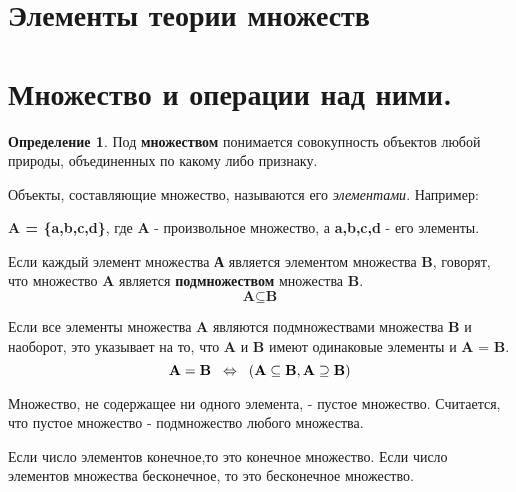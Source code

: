 \documentclass[12pt, a4paper, oneside]{article}
\theoremstyle{plain} %
\theoremstyle{definition}
\newtheorem*{definition}{Определение}  %
\newcommand{\indef}[1]{\textbf{ \color{dark_red} #1}}
\begin{document}
\section*{Элементы теории множеств}


\section{Множество и операции над ними.}

\begin{definition}
Под \indef{множеством} понимается совокупность объектов любой природы, объединенных по какому либо признаку.\par
Объекты, составляющие множество, называются его \textit{элементами}.
Например: \par
\hspace{2mm} \textbf{A = \{a,b,c,d\}}, где \textbf{A} - произвольное множество, а \textbf{a,b,c,d} - его элементы.\par
Если каждый элемент множества \textbf{А} является элементом множества \textbf{B}, говорят, что множество \textbf{A} является \indef{подмножеством} множества \textbf{B}. 
\hspace{1cm} \[\textbf{A} \subseteq \textbf{B}\]

Если все элементы множества \textbf{A} являются подмножествами множества \textbf{B} и наоборот, это указывает на то, что \textbf{A} и \textbf{B} имеют одинаковые элементы и \textbf{A} = \textbf{B}.
\[ \textbf{A} = \textbf{B}\hspace{2mm} \Leftrightarrow \hspace{2mm} (\textbf{A} \subseteq \textbf{B}, \textbf{A} \supseteq \textbf{B}) \]

Множество, не содержащее ни одного элемента, - пустое множество. \varnothing \hspace{2mm} Считается, что пустое множество - подмножество любого множества. \par
Если число элементов конечное,то это конечное множество. Если число элементов множества бесконечное, то это бесконечное множество.
\end{definition}
\end{document}
